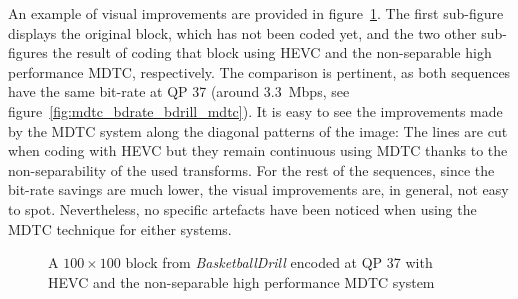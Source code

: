 \documentclass[11pt,a4paper,openright,twoside]{book}
\numberwithin{equation}{section} %
\numberwithin{figure}{section} %
\numberwithin{table}{section} %
\begin{document}
An example of visual improvements are provided in
figure~\ref{fig:mdtc_bdrill_visual}.
The first sub-figure displays the original block, which has not been coded
yet, and the two other sub-figures the result of coding that block using
\ac{HEVC} and the non-separable high performance \ac{MDTC}, respectively.
The comparison is pertinent, as both sequences have the same bit-rate at
\ac{QP} 37 (around \SI{3.3}{\mega bps}, see
figure~\ref{fig:mdtc_bdrate_bdrill_mdtc}).
It is easy to see the improvements made by the \ac{MDTC} system along the
diagonal patterns of the image:
The lines are cut when coding with \ac{HEVC} but they remain continuous using
\ac{MDTC} thanks to the non-separability of the used transforms.
For the rest of the sequences, since the bit-rate savings are much lower, the
visual improvements are, in general,  not easy to spot.
Nevertheless, no specific artefacts have been noticed when using the \ac{MDTC}
technique for either systems.

\begin{figure}[tb]
	\centering
	\hfill
	\hfill
	\caption[Example of a $100\times100$ block from \emph{BasketballDrill}
	coded at \acs{QP} 37]
	{A $100\times100$ block from \emph{BasketballDrill} encoded at \acs{QP} 37
	with \acs{HEVC} and the non-separable high performance \acs{MDTC} system}
	\label{fig:mdtc_bdrill_visual}
\end{figure}
\end{document}
